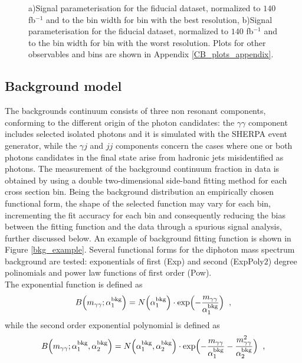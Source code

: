 \begin{figure}[htb]
\caption{a)Signal parameterisation for the fiducial dataset, normalized to $140$ fb$^{-1}$ and to the bin width for bin with the best resolution, b)Signal parameterisation for the fiducial dataset, normalized to $140$ fb$^{-1}$ and to the bin width for bin with the worst resolution. Plots for other observables and bins are shown in Appendix \ref{CB_plots_appendix}.}
\label{signal_param_example}
\end{figure}

\subsection{Background model}
The backgrounds continuum consists of three non resonant components, conforming to the different origin of the photon candidates: the $\gamma\gamma$ component includes selected isolated photons and it is simulated with the S{\scriptsize HERPA} event generator, while the $\gamma j$ and $jj$ components concern the cases where one or both photons candidates in the final state arise from hadronic jets misidentified as photons. The measurement of the background continuum fraction in data is obtained by using a double two-dimensional side-band fitting method for each cross section bin. Being the background distribution an empirically chosen functional form, the shape of the selected function may vary for each bin, incrementing the fit accuracy for each bin and consequently reducing the bias between the fitting function and the data through a spurious signal analysis, further discussed below. An example of background fitting function is shown in Figure \ref{bkg_example}. Several functional forms for the diphoton mass spectrum background are tested: exponentials of first (Exp) and second (ExpPoly$2$) degree polinomials and power law functions of first order (Pow).
\\
The exponential function is defined as 
\begin{equation}
B\Bigl(m_{\gamma\gamma}; \alpha_1^{\text{bkg}}\Bigr) = N\Bigl(\alpha_1^{\text{bkg}}\Bigr) \cdot \text{exp}\Bigl(-\frac{m_{\gamma\gamma}}{\alpha_1^{\text{bkg}}}\Bigr) \hspace{0.2cm} \text{,}
\end{equation}
while the second order exponential polynomial is defined as
\begin{equation}
B\Bigl(m_{\gamma\gamma}; \alpha_1^{\text{bkg}}, \alpha_2^{\text{bkg}}\Bigr) = N\Bigl(\alpha_1^{\text{bkg}}, \alpha_2^{\text{bkg}}\Bigr) \cdot \text{exp}\Bigl(-\frac{m_{\gamma\gamma}}{\alpha_1^{\text{bkg}}} - \frac{m_{\gamma\gamma}^2}{\alpha_2^{\text{bkg}}}\Bigr) \hspace{0.2cm} \text{,}
\end{equation}
